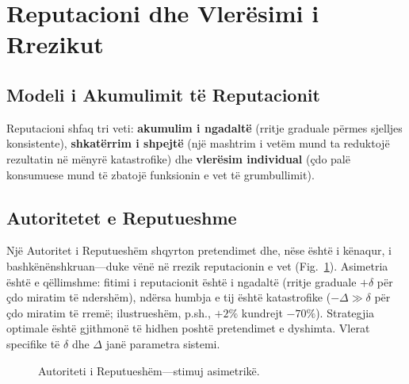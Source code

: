 \documentclass[11pt,a4paper,twocolumn]{article}
\begin{document}
\section{Reputacioni dhe Vlerësimi i Rrezikut}

\subsection{Modeli i Akumulimit të Reputacionit}

Reputacioni shfaq tri veti: \textbf{akumulim i ngadaltë} (rritje graduale përmes sjelljes konsistente), \textbf{shkatërrim i shpejtë} (një mashtrim i vetëm mund ta reduktojë rezultatin në mënyrë katastrofike) dhe \textbf{vlerësim individual} (çdo palë konsumuese mund të zbatojë funksionin e vet të grumbullimit).

\subsection{Autoritetet e Reputueshme}

Një Autoritet i Reputueshëm shqyrton pretendimet dhe, nëse është i kënaqur, i bashkënënshkruan---duke vënë në rrezik reputacionin e vet (Fig.~\ref{fig:authority}). Asimetria është e qëllimshme: fitimi i reputacionit është i ngadaltë (rritje graduale $+\delta$ për çdo miratim të ndershëm), ndërsa humbja e tij është katastrofike ($-\Delta \gg \delta$ për çdo miratim të rremë; ilustrueshëm, p.sh., $+2\%$ kundrejt $-70\%$). Strategjia optimale është gjithmonë të hidhen poshtë pretendimet e dyshimta. Vlerat specifike të $\delta$ dhe $\Delta$ janë parametra sistemi.

\begin{figure}[ht]
\centering
{}
\caption{Autoriteti i Reputueshëm---stimuj asimetrikë.}
\label{fig:authority}
\end{figure}
\end{document}
